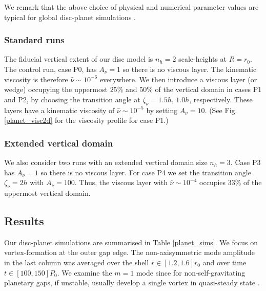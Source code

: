 We remark that the above choice of physical and numerical parameter
values are typical for global disc-planet simulations
\citep[e.g.][]{valborro06,mignone12}.  


\subsubsection{Standard runs} 
The fiducial vertical extent of our disc model is $n_h=2$
scale-heights at $R=r_0$.  The control run, case P0, has $A_\nu=1$ so there is 
no viscous layer. The kinematic viscosity is therefore
$\hat{\nu}\sim10^{-6}$  everywhere. We then introduce a viscous
layer (or wedge) occupying the uppermost $25\%$ and $50\%$ of the
vertical domain in cases P1 and P2, by choosing the transition angle
at $\zeta_\nu = 1.5h,\,1.0h$, respectively. These layers have a kinematic 
viscosity of $\hat{\nu}\sim 10^{-5}$ by setting $A_\nu=10$.  (See
Fig. \ref{planet_visc2d} for the viscosity profile for case P1.)  


\subsubsection{Extended vertical domain}
We also consider two runs with an extended vertical domain size
$n_h=3$. Case P3 has $A_\nu=1$ so there is no viscous layer. For case
P4 we set the transition angle $\zeta_\nu=2h$ with $A_\nu=100$. 
Thus, the viscous layer with $\hat{\nu}\sim10^{-4}$ occupies $33\%$ of
the uppermost vertical domain. 




\subsection{Results}
Our disc-planet simulations are summarised in Table \ref{planet_sims}.
We focus on vortex-formation at the outer gap edge. 
The non-axisymmetric mode amplitude in the last column was 
averaged over the shell $r\in[1.2,1.6]r_0$ and over time 
$t\in[100,150]P_0$. We examine the $m=1$ mode since 
for non-self-gravitating planetary gaps, if unstable, usually develop
a single vortex in quasi-steady state \citep{valborro07,lin10}.   

